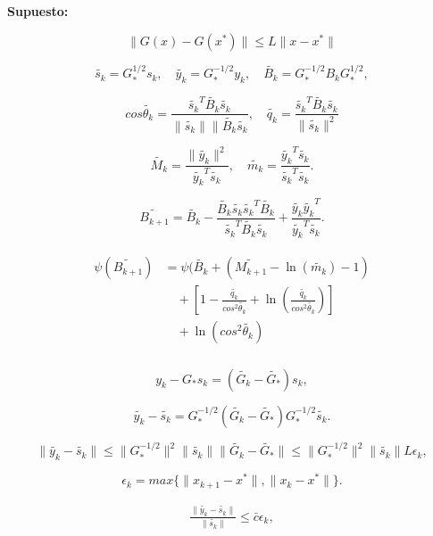 \documentclass[12pt]{article}
\begin{document}
 \textbf{Supuesto:}
 
 \[ \|G(x) - G(x^*)\| \leq L \| x - x^* \|\]
 
 \[ \tilde{s_k} = G_{*}^{1/2}s_k, \quad \tilde{y_k} = G_{*}^{-1/2}y_k, \quad \tilde{B_k} = G_{*}^{-1/2} B_k G_{*}^{1/2},\]
 
 \[ cos \tilde{\theta_k} = \frac{\tilde{s_k}^T \tilde{B_k} \tilde{s_k}}{\|\tilde{s_k}\| \|\tilde{B_k} \tilde{s_k}},\quad \tilde{q_k} = \frac{\tilde{s_k}^T \tilde{B_k} \tilde{s_k}}{\|\tilde{s_k}\|^2}\]
 
 \[ \tilde{M_k} = \frac{\| \tilde{y_k} \|^2}{\tilde{y_k}^T \tilde{s_k}},\quad \tilde{m_k} = \frac{\tilde{y_k}^T \tilde{s_k} }{\tilde{s_k}^T \tilde{s_k}}.\]
  
\[ \tilde{B_{k+1}} = \tilde{B_{k}} - \frac{\tilde{B_{k}} \tilde{s_{k}} \tilde{s_{k}}^T \tilde{B_{k}}}{\tilde{s_{k}}^T \tilde{B_{k}} \tilde{s_{k}}} + \frac{\tilde{y_{k}} \tilde{y_{k}}^T }{\tilde{y_{k}}^T \tilde{s_{k}}}.\]

\begin{eqnarray}  \label{6.53}
\begin{split}
\psi(\tilde{B_{k+1}}) & = \psi(\tilde{B_{k}} + (\tilde{M_{k+1}} - \ln(\tilde{m_{k}}) -1)\\
& \quad + \left[ 1 - \frac{\tilde{q_k}}{cos^2 \tilde{\theta_k}} + \ln\left(\frac{\tilde{q_k}}{cos^2 \tilde{\theta_k}} \right) \right]\\
& \quad + \ln\left(cos^2 \tilde{\theta_k} \right)\\
\end{split}
\end{eqnarray}

\[ y_k - G_{*} s_k = (\tilde{G_k} - \tilde{G_{*}}) s_k,\]

\[ \tilde{y_k} - \tilde{s_k} = G_{*}^{-1/2} (\tilde{G_k} - \tilde{G_{*}}) G_{*}^{-1/2} \tilde{s_k}.\]

\[ \|\tilde{y_k} - \tilde{s_k}\| \leq \|G_{*}^{-1/2}\|^2 \|\tilde{s_k}\| \|\tilde{G_k} - \tilde{G_{*}}\| \leq \|G_{*}^{-1/2}\|^2 \|\tilde{s_k}\| L\epsilon_k,\]

\[ \epsilon_k = max\{ \|x_{k+1} - x^*\|, \|x_{k} - x^*\|\}.\]

\begin{eqnarray}  \label{6.54}
\frac{\|\tilde{y_k} - \tilde{s_k}\|}{\| \tilde{s_k}\|} \leq \bar{c} \epsilon_k,
\end{eqnarray}


 
\end{document}
